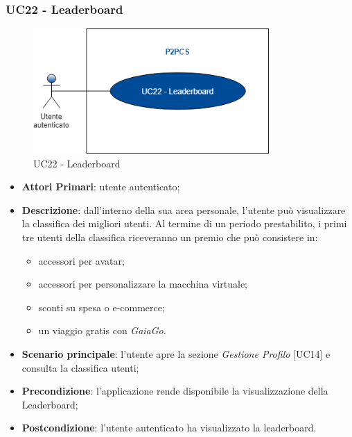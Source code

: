 \newpage
\subsubsection{UC22 - Leaderboard}
\begin{figure}[h]
	\includegraphics[width=9cm]{res/images/UC22Leaderboard.png}
	\centering
	\caption{UC22 - Leaderboard}
\end{figure}
\begin{itemize}
	\item \textbf{Attori Primari}: utente autenticato;
	\item \textbf{Descrizione}: dall'interno della sua area personale, l'utente può visualizzare la classifica dei migliori utenti. Al termine di un periodo prestabilito, i primi tre utenti della classifica riceveranno un premio che può consistere in:
	\begin{itemize}
		\item accessori per avatar;
		\item accessori per personalizzare la macchina virtuale;
		\item sconti su spesa o e-commerce;
		\item un viaggio gratis con \textit{GaiaGo}.
	\end{itemize}
	\item \textbf{Scenario principale}: l'utente apre la sezione \textit{Gestione Profilo} [UC14] e consulta la classifica utenti;
	\item \textbf{Precondizione}: l'applicazione rende disponibile la visualizzazione della Leaderboard\glo;
	\item \textbf{Postcondizione}: l'utente autenticato ha visualizzato la leaderboard.
\end{itemize}

